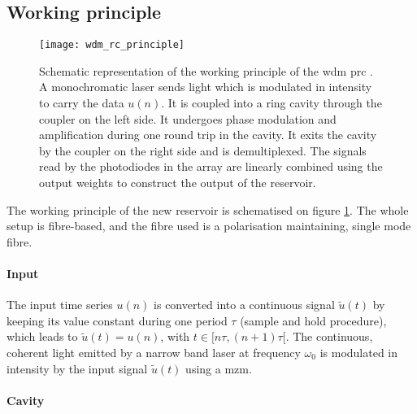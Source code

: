 
\subsection{Working principle}

\begin{figure}[h]
	\centering
	\texttt{[image: wdm\_rc\_principle]}
	\caption{Schematic representation of the working principle of the \gls{wdm} \gls{prc} \cite{AkroutAkram2016Pprc}. A monochromatic laser sends light which is modulated in intensity to carry the data $u(n)$. It is coupled into a ring cavity through the coupler on the left side. It undergoes phase modulation and amplification during one round trip in the cavity. It exits the cavity by the coupler on the right side and is demultiplexed. The signals read by the photodiodes in the array are linearly combined using the output weights to construct the output of the reservoir.}
	\label{wdm_rc_principle}
\end{figure}


The working principle of the new reservoir is schematised on figure \ref{wdm_rc_principle}. The whole setup is fibre-based, and the fibre used is a polarisation maintaining, single mode fibre. 

\paragraph{Input}

The input time series $u(n)$ is converted into a continuous signal $\tilde{u}(t)$ by keeping its value constant during one period $\tau$ (sample and hold procedure), which leads to $\tilde{u}(t)=u(n)$, with $t \in [n\tau, (n+1)\tau[$. The continuous, coherent light emitted by a narrow band laser at frequency $\omega_0$ is modulated in intensity by the input signal $\tilde{u}(t)$ using a \gls{mzm}.  

\paragraph{Cavity}

